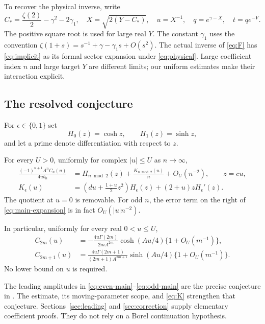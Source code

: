 To recover the physical inverse, write
\begin{equation}\label{eq:physical}
 C_* =\frac{\zeta(2)}2-\gamma^2-2\gamma_1,
 \quad X=\sqrt{2(Y-C_*)},\quad u=X^{-1},\quad q=e^{\gamma-X},
 \quad t=qe^{-V}.
\end{equation}
The positive square root is used for large real $Y$. The constant
$\gamma_1$ uses the convention
$\zeta(1+s)=s^{-1}+\gamma-\gamma_1s+O(s^2)$.
The actual inverse of \eqref{eq:F} has \eqref{eq:implicit} as its formal
sector expansion under \eqref{eq:physical}. Large coefficient index $n$ and
large target $Y$ are different limits; our uniform estimates make their
interaction explicit.

\subsection{The resolved conjecture}

For $\epsilon\in\{0,1\}$ set
\[
 H_0(z)=\cosh z,\qquad H_1(z)=\sinh z,
\]
and let a prime denote differentiation with respect to $z$.

\begin{theorem}\label{thm:main}
For every $U>0$, uniformly for complex $|u|\le U$ as $n\to\infty$,
\begin{align}
 \frac{(-1)^{n+1}A^nC_n(u)}{4ub_n}
 &=H_{n\bmod2}(z)+\frac{K_{n\bmod2}(u)}n
      +O_U(n^{-2}),\qquad z=cu,\label{eq:main-expansion}\\
 K_\epsilon(u)
 &=\left(du+\frac{1+u}{2}z^2\right)H_\epsilon(z)
       +(2+u)zH_\epsilon'(z).\label{eq:K}
\end{align}
The quotient at $u=0$ is removable. For odd $n$, the error term on the
right of \eqref{eq:main-expansion} is in fact $O_U(|u|n^{-2})$.

In particular, uniformly for every real $0<u\le U$,
\begin{align}
 C_{2m}(u)
 &=-\frac{4u\Gamma(2m)}{2mA^{2m}}\cosh(Au/4)
       \{1+O_U(m^{-1})\},\label{eq:even-main}\\
 C_{2m+1}(u)
 &=\frac{4u\Gamma(2m+1)}{(2m+1)A^{2m+1}}\sinh(Au/4)
       \{1+O_U(m^{-1})\}.\label{eq:odd-main}
\end{align}
No lower bound on $u$ is required.
\end{theorem}

The leading amplitudes in \eqref{eq:even-main}--\eqref{eq:odd-main} are the
precise conjecture in \cite{incoming}. The estimate, its moving-parameter
scope, and \eqref{eq:K} strengthen that conjecture. Sections~\ref{sec:leading}
and \ref{sec:correction} supply elementary coefficient proofs.
They do not rely on a Borel continuation hypothesis.

